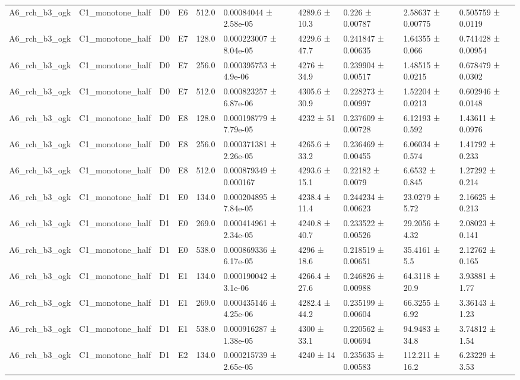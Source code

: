 \begin{table}
\begin{tabular}{llllllllll}
A6\_rch\_b3\_ogk & C1\_monotone\_half & D0 & E6 & 512.0 & 0.00084044 ± 2.58e-05 & 4289.6 ± 10.3 & 0.226 ± 0.00787 & 2.58637 ± 0.00775 & 0.505759 ± 0.0119 \\
A6\_rch\_b3\_ogk & C1\_monotone\_half & D0 & E7 & 128.0 & 0.000223007 ± 8.04e-05 & 4229.6 ± 47.7 & 0.241847 ± 0.00635 & 1.64355 ± 0.066 & 0.741428 ± 0.00954 \\
A6\_rch\_b3\_ogk & C1\_monotone\_half & D0 & E7 & 256.0 & 0.000395753 ± 4.9e-06 & 4276 ± 34.9 & 0.239904 ± 0.00517 & 1.48515 ± 0.0215 & 0.678479 ± 0.0302 \\
A6\_rch\_b3\_ogk & C1\_monotone\_half & D0 & E7 & 512.0 & 0.000823257 ± 6.87e-06 & 4305.6 ± 30.9 & 0.228273 ± 0.00997 & 1.52204 ± 0.0213 & 0.602946 ± 0.0148 \\
A6\_rch\_b3\_ogk & C1\_monotone\_half & D0 & E8 & 128.0 & 0.000198779 ± 7.79e-05 & 4232 ± 51 & 0.237609 ± 0.00728 & 6.12193 ± 0.592 & 1.43611 ± 0.0976 \\
A6\_rch\_b3\_ogk & C1\_monotone\_half & D0 & E8 & 256.0 & 0.000371381 ± 2.26e-05 & 4265.6 ± 33.2 & 0.236469 ± 0.00455 & 6.06034 ± 0.574 & 1.41792 ± 0.233 \\
A6\_rch\_b3\_ogk & C1\_monotone\_half & D0 & E8 & 512.0 & 0.000879349 ± 0.000167 & 4293.6 ± 15.1 & 0.22182 ± 0.0079 & 6.6532 ± 0.845 & 1.27292 ± 0.214 \\
A6\_rch\_b3\_ogk & C1\_monotone\_half & D1 & E0 & 134.0 & 0.000204895 ± 7.84e-05 & 4238.4 ± 11.4 & 0.244234 ± 0.00623 & 23.0279 ± 5.72 & 2.16625 ± 0.213 \\
A6\_rch\_b3\_ogk & C1\_monotone\_half & D1 & E0 & 269.0 & 0.000414961 ± 2.34e-05 & 4240.8 ± 40.7 & 0.233522 ± 0.00526 & 29.2056 ± 4.32 & 2.08023 ± 0.141 \\
A6\_rch\_b3\_ogk & C1\_monotone\_half & D1 & E0 & 538.0 & 0.000869336 ± 6.17e-05 & 4296 ± 18.6 & 0.218519 ± 0.00651 & 35.4161 ± 5.5 & 2.12762 ± 0.165 \\
A6\_rch\_b3\_ogk & C1\_monotone\_half & D1 & E1 & 134.0 & 0.000190042 ± 3.1e-06 & 4266.4 ± 27.6 & 0.246826 ± 0.00988 & 64.3118 ± 20.9 & 3.93881 ± 1.77 \\
A6\_rch\_b3\_ogk & C1\_monotone\_half & D1 & E1 & 269.0 & 0.000435146 ± 4.25e-06 & 4282.4 ± 44.2 & 0.235199 ± 0.00604 & 66.3255 ± 6.92 & 3.36143 ± 1.23 \\
A6\_rch\_b3\_ogk & C1\_monotone\_half & D1 & E1 & 538.0 & 0.000916287 ± 1.38e-05 & 4300 ± 33.1 & 0.220562 ± 0.00694 & 94.9483 ± 34.8 & 3.74812 ± 1.54 \\
A6\_rch\_b3\_ogk & C1\_monotone\_half & D1 & E2 & 134.0 & 0.000215739 ± 2.65e-05 & 4240 ± 14 & 0.235635 ± 0.00583 & 112.211 ± 16.2 & 6.23229 ± 3.53 \\

\end{tabular}
\end{table}

